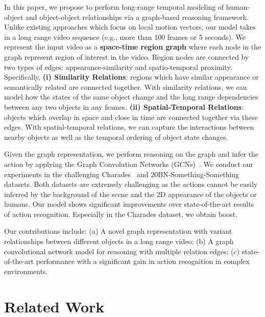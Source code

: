 \documentclass[runningheads]{llncs}
\begin{document}
In this paper, we propose to perform long-range temporal modeling of human-object and object-object relationships via a graph-based reasoning framework. Unlike existing approaches which focus on local motion vectors, our model takes in a long range video sequence (e.g., more than 100 frames or 5 seconds). We represent the input video as a {\bf space-time region graph} where each node in the graph represent region of interest in the video. Region nodes are connected by two types of edges: appearance-similarity and spatio-temporal proximity. Specifically, \textbf{(i) Similarity Relations}: regions which have similar appearance or semantically related are connected together. With similarity relations, we can model how the states of the same object change and the long range dependencies between any two objects in any frames.  \textbf{(ii) Spatial-Temporal Relations}: objects which overlap in space and close in time are connected together via these edges. With spatial-temporal relations, we can capture the interactions between nearby objects as well as the temporal ordering of object state changes. 

Given the graph representation, we perform reasoning on the graph and infer the action by applying the Graph Convolution Networks  (GCNs)~\cite{kipf2017semi}. We conduct our experiments in the challenging Charades~\cite{Sigurdsson2016} and 20BN-Something-Something~\cite{20bnsthsth} datasets. Both datasets are extremely challenging as the actions cannot be easily inferred by the background of the scene and the 2D appearance of the objects or humans. Our model shows significant improvements over state-of-the-art results of action recognition. Especially in the Charades dataset, we obtain  boost.  

Our contributions include: (a) A novel graph representation with variant relationships between different objects in a long range video; (b) A graph convolutional network model for reasoning with multiple relation edges; (c) state-of-the-art performance with a significant gain in action recognition in complex environments. 


\vspace{-0.1in}
\section{Related Work}
\vspace{-0.1in}
\end{document}
